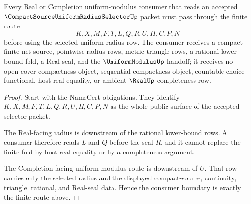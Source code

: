 \begin{theorem}
\label{thm:compact-source-uniform-radius-selector-consumer-boundary}
Every Real or Completion uniform-modulus consumer that reads an accepted $\CompactSourceUniformRadiusSelectorUp$ packet must pass through the finite route
$$
K,X,M,F,T,L,Q,R,U,H,C,P,N
$$
before using the selected uniform-radius row. The consumer receives a compact finite-net source, pointwise-radius rows, metric triangle rows, a rational lower-bound fold, a Real seal, and the $\UniformModulusUp$ handoff; it receives no open-cover compactness object, sequential compactness object, countable-choice functional, host real equality, or ambient $\RealUp$ completeness row.
\end{theorem}
\begin{proof}
Start with the NameCert obligations. They identify $K,X,M,F,T,L,Q,R,U,H,C,P,N$ as the whole public surface of the accepted selector packet.

The Real-facing radius is downstream of the rational lower-bound rows. A consumer therefore reads $L$ and $Q$ before the seal $R$, and it cannot replace the finite fold by host real equality or by a completeness argument.

The Completion-facing uniform-modulus route is downstream of $U$. That row carries only the selected radius and the displayed compact-source, continuity, triangle, rational, and Real-seal data. Hence the consumer boundary is exactly the finite route above.
\end{proof}




